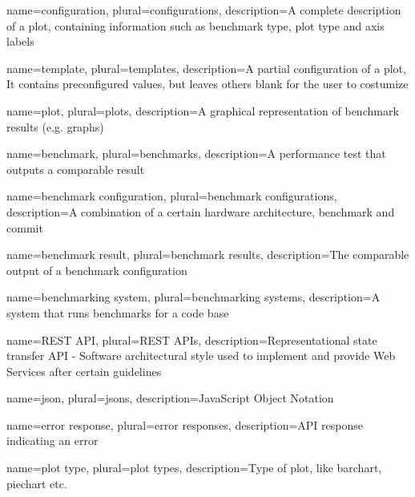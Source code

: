 \makenoidxglossaries

{
	name=configuration,
	plural=configurations,
	description={A complete description of a \gls{plot}, containing information such as benchmark type, \gls{plot type} and axis labels}
}

{
	name=template,
	plural=templates,
	description={A partial configuration of a \gls{plot}, It contains preconfigured values, but leaves others blank for the user to costumize}
}

{
	name=plot,
	plural=plots,
	description={A graphical representation of \glspl{benchmark result} (e.g. graphs)}
}

{
	name=benchmark,
	plural=benchmarks,
	description={A performance test that outputs a comparable result}
}

{
	name=benchmark configuration,
	plural=benchmark configurations,
	description={A combination of a certain hardware architecture, \gls{benchmark} and commit}
}

{
	name=benchmark result,
	plural=benchmark results,
	description={The comparable output of a \gls{benchmark configuration}}
}

{
	name=benchmarking system,
	plural=benchmarking systems,
	description={A system that runs benchmarks for a code base}
}

{
	name=REST API,
	plural=REST APIs,
	description={Representational state transfer API - Software architectural style used to implement and provide Web Services after certain guidelines}
}


{
    name=json,
    plural=jsons,
    description={JavaScript Object Notation}
}

{
    name=error response,
    plural=error responses,
    description={API response indicating an error}
}

{
    name=plot type,
    plural=plot types,
    description={Type of plot, like barchart, piechart etc.}
}
